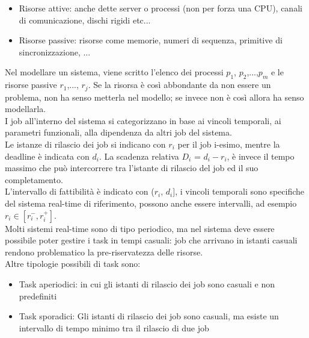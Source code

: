 \documentclass[12pt, oneside]{extbook}
\begin{document}
\begin{itemize}
\item Risorse attive: anche dette server o processi (non per forza una CPU), canali di comunicazione, dischi rigidi etc...
\item Risorse passive: risorse come memorie, numeri di sequenza, primitive di sincronizzazione, ...
\end{itemize} 
Nel modellare un sistema, viene scritto l'elenco dei processi $p_1$, $p_2$,...,$p_m$ e le risorse passive $r_1$,..., $r_j$. Se la risorsa è così abbondante da non essere un problema, non ha senso metterla nel modello; se invece non è così allora ha senso modellarla.\\ I job all'interno del sistema si categorizzano in base ai vincoli temporali, ai parametri funzionali, alla dipendenza da altri job del sistema.\\ Le istanze di rilascio dei job si indicano con $r_i$ per il job i-esimo, mentre la deadline è indicata con $d_i$. La scadenza relativa $D_i$ = $d_i - r_i$, è invece il tempo massimo che può intercorrere tra l'istante di rilascio del job ed il suo completamento.\\ L'intervallo di fattibilità è indicato con ($r_i$, $d_i$], i vincoli temporali sono specifiche del sistema real-time di riferimento, possono anche essere intervalli, ad esempio $r_i \in [r_i^{-}, r_i^{+}]$.\\ Molti sistemi real-time sono di tipo periodico, ma nel sistema deve essere possibile poter gestire i task in tempi casuali: job che arrivano in istanti casuali rendono problematico la pre-riservatezza delle risorse.\\ Altre tipologie possibili di task sono:
\begin{itemize}
\item Task aperiodici: in cui gli istanti di rilascio dei job sono casuali e non predefiniti
\item Task sporadici: Gli istanti di rilascio dei job sono casuali, ma esiste un intervallo di tempo minimo tra il rilascio di due job
\end{itemize}
\end{document}
